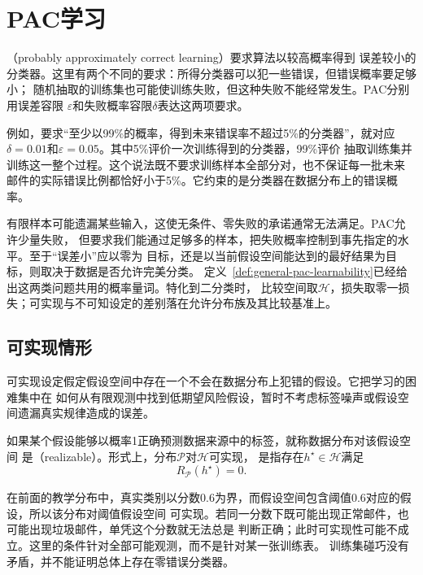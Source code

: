 \section{PAC学习}
\label{sec:pac-learning}

（probably approximately correct learning）要求算法以较高概率得到
误差较小的分类器。这里有两个不同的要求：所得分类器可以犯一些错误，但错误概率要足够小；
随机抽取的训练集也可能使训练失败，但这种失败不能经常发生。PAC分别用误差容限
$\varepsilon$和失败概率容限$\delta$表达这两项要求。

例如，要求“至少以99\%的概率，得到未来错误率不超过5\%的分类器”，就对应
$\delta=0.01$和$\varepsilon=0.05$。其中5\%评价一次训练得到的分类器，99\%评价
抽取训练集并训练这一整个过程。这个说法既不要求训练样本全部分对，也不保证每一批未来
邮件的实际错误比例都恰好小于5\%。它约束的是分类器在数据分布上的错误概率。

有限样本可能遗漏某些输入，这使无条件、零失败的承诺通常无法满足。PAC允许少量失败，
但要求我们能通过足够多的样本，把失败概率控制到事先指定的水平。至于“误差小”应以零为
目标，还是以当前假设空间能达到的最好结果为目标，则取决于数据是否允许完美分类。
定义~\ref{def:general-pac-learnability}已经给出这两类问题共用的概率量词。特化到二分类时，
比较空间取$\mathcal H$，损失取零一损失；可实现与不可知设定的差别落在允许分布族及其比较基准上。

\subsection{可实现情形}

可实现设定假定假设空间中存在一个不会在数据分布上犯错的假设。它把学习的困难集中在
如何从有限观测中找到低期望风险假设，暂时不考虑标签噪声或假设空间遗漏真实规律造成的误差。

\begin{definition}[可实现性]
\label{def:realizability}
如果某个假设能够以概率1正确预测数据来源中的标签，就称数据分布对该假设空间
是（realizable）。形式上，分布$\mathcal P$对$\mathcal H$可实现，
是指存在$h^\star\in\mathcal H$满足
\[
 R_{\mathcal P}(h^\star)=0.
\]
\end{definition}

在前面的教学分布中，真实类别以分数0.6为界，而假设空间包含阈值0.6对应的假设，所以该分布对阈值假设空间
可实现。若同一分数下既可能出现正常邮件，也可能出现垃圾邮件，单凭这个分数就无法总是
判断正确；此时可实现性可能不成立。这里的条件针对全部可能观测，而不是针对某一张训练表。
训练集碰巧没有矛盾，并不能证明总体上存在零错误分类器。

